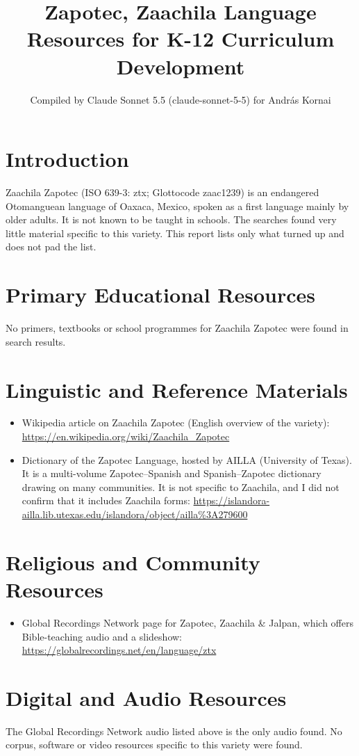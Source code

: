 \documentclass[12pt]{article}
\title{Zapotec, Zaachila Language Resources for K-12 Curriculum Development}
\author{Compiled by Claude Sonnet 5.5 (claude-sonnet-5-5) for Andr\'as Kornai}
\date{}
\begin{document}
\maketitle

\section{Introduction}
Zaachila Zapotec (ISO 639-3: ztx; Glottocode zaac1239) is an endangered Otomanguean language of Oaxaca, Mexico, spoken as a first language mainly by older adults. It is not known to be taught in schools. The searches found very little material specific to this variety. This report lists only what turned up and does not pad the list.

\section{Primary Educational Resources}
No primers, textbooks or school programmes for Zaachila Zapotec were found in search results.

\section{Linguistic and Reference Materials}
\begin{itemize}
\item Wikipedia article on Zaachila Zapotec (English overview of the variety): \url{https://en.wikipedia.org/wiki/Zaachila_Zapotec}
\item Dictionary of the Zapotec Language, hosted by AILLA (University of Texas). It is a multi-volume Zapotec--Spanish and Spanish--Zapotec dictionary drawing on many communities. It is not specific to Zaachila, and I did not confirm that it includes Zaachila forms: \url{https://islandora-ailla.lib.utexas.edu/islandora/object/ailla%3A279600}
\end{itemize}

\section{Religious and Community Resources}
\begin{itemize}
\item Global Recordings Network page for Zapotec, Zaachila \& Jalpan, which offers Bible-teaching audio and a slideshow: \url{https://globalrecordings.net/en/language/ztx}
\end{itemize}

\section{Digital and Audio Resources}
The Global Recordings Network audio listed above is the only audio found. No corpus, software or video resources specific to this variety were found.
\end{document}
